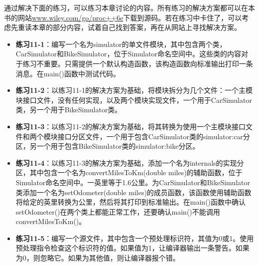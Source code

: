 通过解决下面的练习，可以练习本章讨论的内容。所有练习的解决方案都可以在本书的网站\url{www.wiley.com/go/proc++6e}下载到源码。若在练习中卡住了，可以考虑先重读本章的部分内容，试着自己找到答案，再在从网站上寻找解决方案。

\begin{itemize}
\item
\textbf{练习11-1}：编写一个名为simulator的单文件模块，其中包含两个类，CarSimulator和BikeSimulator，位于Simulator命名空间中。这些类的内容对于练习不重要。只需提供一个默认构造函数，该构造函数向标准输出打印一条消息。在main()函数中测试代码。

\item
\textbf{练习11-2}：以练习11-1的解决方案为基础，将模块拆分为几个文件：一个主模块接口文件，没有任何实现，以及两个模块实现文件，一个用于CarSimulator类，另一个用于BikeSimulator类。

\item
\textbf{练习11-3}：以练习11-2的解决方案为基础，将其转换为使用一个主模块接口文件和两个模块接口分区文件，一个用于包含CarSimulator类的simulator:car分区，另一个用于包含BikeSimulator类的simulator:bike分区。

\item
\textbf{练习11-4}：以练习11-3的解决方案为基础，添加一个名为internals的实现分区，其中包含一个名为convertMilesToKm(double miles)的辅助函数，位于Simulator命名空间中。一英里等于1.6公里。为CarSimulator和BikeSimulator类添加一个名为setOdometer(double miles)的成员函数，该函数使用辅助函数将给定的英里转换为公里，然后将其打印到标准输出。在main()函数中确认setOdometer()在两个类上都能正常工作，还要确认main()不能调用convertMilesToKm()。

\item
\textbf{练习11-5}：编写一个源文件，其中包含一个预处理标识符，其值为0或1。使用预处理指令检查这个标识符的值。如果值为1，让编译器输出一条警告。如果为0，则忽略它。如果为其他值，则让编译器报个错。
\end{itemize}













